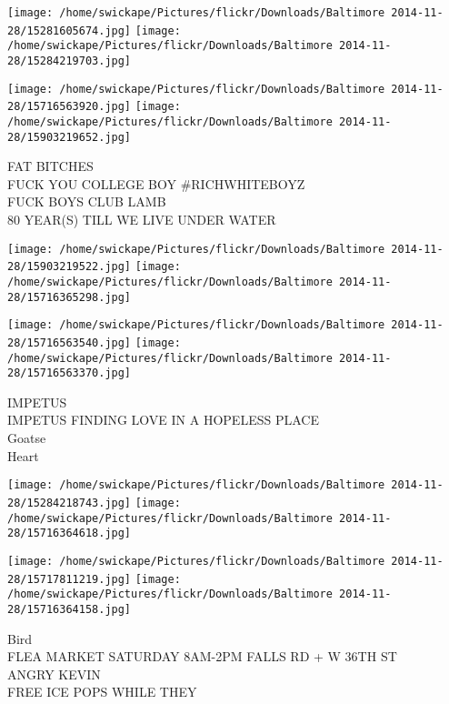 \documentclass[10pt,letterpaper]{article}
\begin{document}
\texttt{[image: /home/swickape/Pictures/flickr/Downloads/Baltimore 2014-11-28/15281605674.jpg]}
\texttt{[image: /home/swickape/Pictures/flickr/Downloads/Baltimore 2014-11-28/15284219703.jpg]}

\texttt{[image: /home/swickape/Pictures/flickr/Downloads/Baltimore 2014-11-28/15716563920.jpg]}
\texttt{[image: /home/swickape/Pictures/flickr/Downloads/Baltimore 2014-11-28/15903219652.jpg]}

FAT BITCHES\\
FUCK YOU COLLEGE BOY \#RICHWHITEBOYZ\\
FUCK BOYS CLUB LAMB\\
80 YEAR(S) TILL WE LIVE UNDER WATER\\
\pagebreak

\texttt{[image: /home/swickape/Pictures/flickr/Downloads/Baltimore 2014-11-28/15903219522.jpg]}
\texttt{[image: /home/swickape/Pictures/flickr/Downloads/Baltimore 2014-11-28/15716365298.jpg]}

\texttt{[image: /home/swickape/Pictures/flickr/Downloads/Baltimore 2014-11-28/15716563540.jpg]}
\texttt{[image: /home/swickape/Pictures/flickr/Downloads/Baltimore 2014-11-28/15716563370.jpg]}

IMPETUS\\
IMPETUS FINDING LOVE IN A HOPELESS PLACE\\
Goatse\\
Heart\\
\pagebreak

\texttt{[image: /home/swickape/Pictures/flickr/Downloads/Baltimore 2014-11-28/15284218743.jpg]}
\texttt{[image: /home/swickape/Pictures/flickr/Downloads/Baltimore 2014-11-28/15716364618.jpg]}

\texttt{[image: /home/swickape/Pictures/flickr/Downloads/Baltimore 2014-11-28/15717811219.jpg]}
\texttt{[image: /home/swickape/Pictures/flickr/Downloads/Baltimore 2014-11-28/15716364158.jpg]}

Bird\\
FLEA MARKET SATURDAY 8AM{-}2PM FALLS RD + W 36TH ST\\
ANGRY KEVIN\\
FREE ICE POPS WHILE THEY\\
\pagebreak
\end{document}
